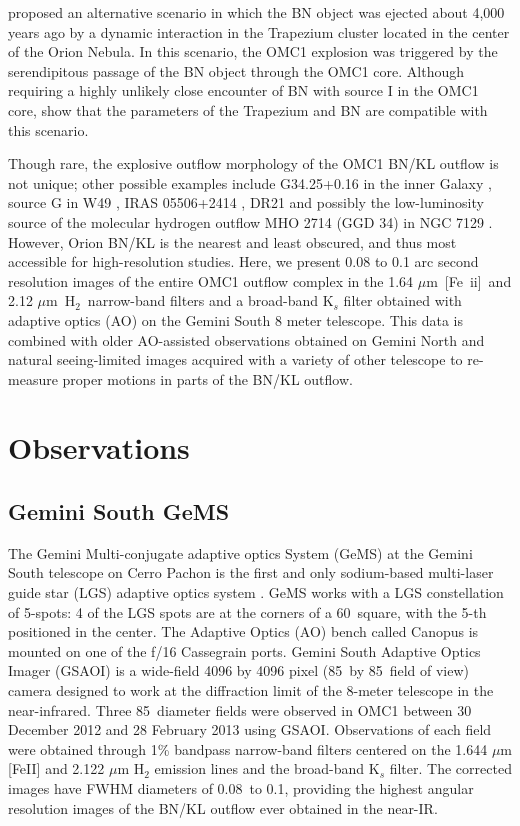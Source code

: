 \documentclass{aa}
\newcommand{\Feii}{[Fe~{\sc ii}]}
\newcommand{\um}{$\mu$m}
\newcommand{\hh}{\ensuremath{\textrm{H}_{2}}}			%
\begin{document}
\citet{Tan2004} proposed an alternative scenario in which the BN object was ejected 
about 4,000 years ago by a dynamic interaction in the Trapezium cluster located 
in the center of the Orion Nebula.   In this scenario,  the OMC1 explosion was
triggered by the  serendipitous passage of the BN object through the OMC1 core.   
Although  requiring a highly unlikely close encounter of  BN with source I in the 
OMC1 core,  \citet{Tan2012} show that the parameters of the Trapezium and 
BN are compatible with  this scenario.
 
Though rare, the explosive outflow morphology of the  OMC1 BN/KL 
outflow is not unique; other possible  examples include G34.25+0.16 in the inner
Galaxy \citep{Cyganowski2008},  source G in W49 \citep{Smith2009}, 
IRAS 05506+2414  \citep{Sahai2008}, DR21 \citep{Zapata2013}
and possibly the  low-luminosity source
of the molecular hydrogen outflow MHO 2714 (GGD 34) in NGC 7129
\citep{Eisloffel2000}.   However,  Orion BN/KL 
is the nearest and least  obscured,  and thus most accessible for high-resolution 
studies.   Here, we present 0.08 to 0.1 arc second resolution images of the 
entire OMC1 outflow complex in the 1.64 \um\ \Feii\  and 2.12 \um\ \hh\  narrow-band filters 
and a broad-band K$_s$ filter obtained with adaptive optics (AO) on the Gemini South  8 
meter telescope.    This data is combined with  older AO-assisted observations
obtained on Gemini North and natural seeing-limited images acquired with a variety
of other telescope to re-measure proper motions in parts of the BN/KL outflow. 


\section{Observations}

\subsection{Gemini South GeMS}

The Gemini Multi-conjugate adaptive optics System (GeMS) at the Gemini South telescope
on Cerro Pachon is the first and only sodium-based multi-laser guide star (LGS) adaptive
optics system \citep{Rigaut2014,Rigaut2012,Neichel2014,Neichel2013,dOrgeville2012}.
GeMS works with a LGS constellation of 5-spots:  4 of the LGS spots are at the corners of a
60\arcsec\ square, with the 5-th positioned in the center.  The Adaptive Optics (AO)  bench
called Canopus is mounted on one of the f/16 Cassegrain ports.    Gemini South 
Adaptive Optics Imager (GSAOI) is a wide-field 4096 by 4096 pixel 
(85\arcsec\ by 85\arcsec\ field of view) 
camera designed to work at the diffraction limit of the 8-meter telescope in the near-infrared.
Three 85\arcsec\  diameter fields were observed in OMC1 between 30 December 2012 and
28 February 2013 using GSAOI.  Observations of each field were obtained through 1\%
bandpass narrow-band filters centered on the 1.644 $\mu$m [FeII] and 2.122 $\mu$m
H$_2$ emission lines and the broad-band K$_s$ filter.  
The corrected images have FWHM diameters of 0.08\arcsec\ to  0.1\arcsec , providing the 
highest angular resolution images of the BN/KL outflow ever obtained in the near-IR. 
\end{document}
